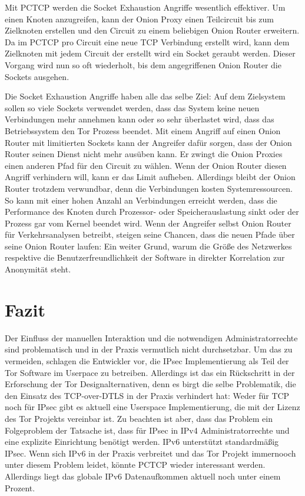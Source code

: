 \documentclass[fleqn,envcountsame,runningheads,10pt,a4paper]{llncs}
\begin{document}
Mit PCTCP werden die Socket Exhaustion Angriffe wesentlich effektiver. Um einen 
Knoten anzugreifen, kann der Onion Proxy einen Teilcircuit bis zum Zielknoten 
erstellen und den Circuit zu einem beliebigen Onion Router erweitern. Da im 
PCTCP pro Circuit eine neue TCP Verbindung erstellt wird, kann dem Zielknoten mit 
jedem Circuit der erstellt wird ein Socket geraubt werden. Dieser Vorgang wird 
nun so oft wiederholt, bis dem angegriffenen Onion Router die Sockets ausgehen.

Die Socket Exhaustion Angriffe haben alle das selbe Ziel: Auf dem Zielsystem 
sollen so viele Sockets verwendet werden, dass das System keine neuen 
Verbindungen mehr annehmen kann oder so sehr überlastet wird, dass das 
Betriebssystem den Tor Prozess beendet. Mit einem Angriff auf einen Onion Router 
mit limitierten Sockets kann der Angreifer dafür sorgen, dass der Onion Router 
seinen Dienst nicht mehr ausüben kann. Er zwingt die Onion Proxies einen anderen 
Pfad für den Circuit zu wählen. Wenn der Onion Router diesen Angriff verhindern 
will, kann er das Limit aufheben. Allerdings bleibt der Onion Router trotzdem 
verwundbar, denn die Verbindungen kosten  Systemressourcen. So kann mit einer 
hohen Anzahl an Verbindungen erreicht werden, dass die Performance des Knoten 
durch Prozessor- oder Speicherauslastung sinkt oder der Prozess gar vom Kernel 
beendet wird. Wenn der Angreifer selbst Onion Router für Verkehrsanalysen 
betreibt, steigen seine Chancen, dass die neuen Pfade über seine Onion Router 
laufen: Ein weiter Grund, warum die Größe des Netzwerkes respektive die 
Benutzerfreundlichkeit der Software in direkter Korrelation zur Anonymität 
steht.
\section{Fazit}

Der Einfluss der manuellen Interaktion und die notwendigen Administratorrechte sind 
problematisch und in der Praxis vermutlich nicht durchsetzbar. Um das zu 
vermeiden, schlagen die Entwickler vor, die IPsec Implementierung als Teil der 
Tor Software im Userpace zu betreiben. Allerdings ist das ein Rückschritt in der 
Erforschung der Tor Designalternativen, denn es birgt die selbe Problematik, 
die den Einsatz des TCP-over-DTLS in der Praxis verhindert hat: Weder für TCP 
noch für IPsec gibt es aktuell eine Userspace Implementierung, die mit der 
Lizenz des Tor Projekts vereinbar ist. Zu beachten ist aber, dass das Problem 
ein Folgeproblem der Tatsache ist, dass für IPsec in IPv4 Administratorrechte und 
eine explizite Einrichtung benötigt werden. IPv6 unterstützt standardmäßig IPsec. Wenn
sich IPv6 in der Praxis verbreitet und das Tor Projekt immernooch unter diesem 
Problem leidet, könnte PCTCP wieder interessant werden. Allerdings liegt das 
globale IPv6 Datenaufkommen aktuell noch unter einem Prozent.
\end{document}
